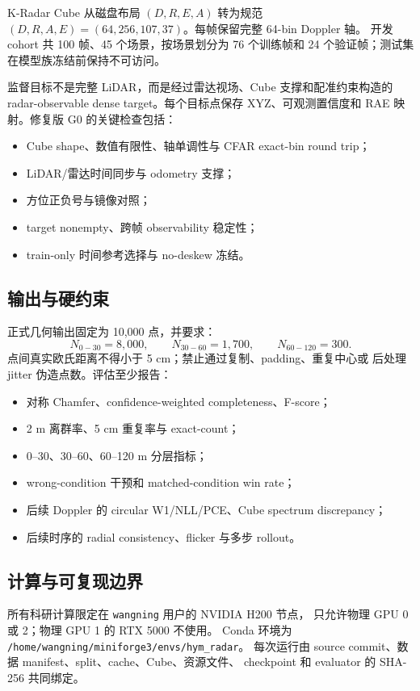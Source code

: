 \documentclass[11pt,a4paper,fontset=none]{ctexart}
\newcommand{\code}[1]{\texttt{#1}}
\begin{document}
K-Radar Cube 从磁盘布局 $(D,R,E,A)$ 转为规范
$(D,R,A,E)=(64,256,107,37)$。每帧保留完整 64-bin Doppler 轴。
开发 cohort 共 100 帧、45 个场景，按场景划分为 76 个训练帧和
24 个验证帧；测试集在模型族冻结前保持不可访问。

监督目标不是完整 LiDAR，而是经过雷达视场、Cube 支撑和配准约束构造的
radar-observable dense target。每个目标点保存 XYZ、可观测置信度和
RAE 映射。修复版 G0 的关键检查包括：
\begin{itemize}
  \item Cube shape、数值有限性、轴单调性与 CFAR exact-bin round trip；
  \item LiDAR/雷达时间同步与 odometry 支撑；
  \item 方位正负号与镜像对照；
  \item target nonempty、跨帧 observability 稳定性；
  \item train-only 时间参考选择与 no-deskew 冻结。
\end{itemize}

\subsection{输出与硬约束}

正式几何输出固定为 10,000 点，并要求：
\begin{equation}
  N_{0-30}=8{,}000,\qquad
  N_{30-60}=1{,}700,\qquad
  N_{60-120}=300.
\end{equation}
点间真实欧氏距离不得小于 5 cm；禁止通过复制、padding、重复中心或
后处理 jitter 伪造点数。评估至少报告：
\begin{itemize}
  \item 对称 Chamfer、confidence-weighted completeness、F-score；
  \item 2 m 离群率、5 cm 重复率与 exact-count；
  \item 0--30、30--60、60--120 m 分层指标；
  \item wrong-condition 干预和 matched-condition win rate；
  \item 后续 Doppler 的 circular W1/NLL/PCE、Cube spectrum discrepancy；
  \item 后续时序的 radial consistency、flicker 与多步 rollout。
\end{itemize}

\subsection{计算与可复现边界}

所有科研计算限定在 \code{wangning} 用户的 NVIDIA H200 节点，
只允许物理 GPU 0 或 2；物理 GPU 1 的 RTX 5000 不使用。
Conda 环境为
\code{/home/wangning/miniforge3/envs/hym\_radar}。
每次运行由 source commit、数据 manifest、split、cache、Cube、资源文件、
checkpoint 和 evaluator 的 SHA-256 共同绑定。
\end{document}
